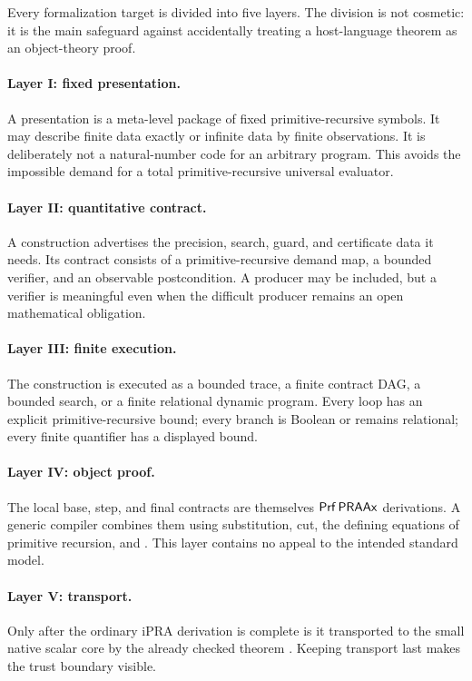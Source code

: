 Every formalization target is divided into five layers. The division is not cosmetic: it is the main safeguard against accidentally treating a host-language theorem as an object-theory proof.

\paragraph{Layer I: fixed presentation.}
A presentation is a meta-level package of fixed primitive-recursive symbols. It may describe finite data exactly or infinite data by finite observations. It is deliberately not a natural-number code for an arbitrary program. This avoids the impossible demand for a total primitive-recursive universal evaluator.

\paragraph{Layer II: quantitative contract.}
A construction advertises the precision, search, guard, and certificate data it needs. Its contract consists of a primitive-recursive demand map, a bounded verifier, and an observable postcondition. A producer may be included, but a verifier is meaningful even when the difficult producer remains an open mathematical obligation.

\paragraph{Layer III: finite execution.}
The construction is executed as a bounded trace, a finite contract DAG, a bounded search, or a finite relational dynamic program. Every loop has an explicit primitive-recursive bound; every branch is Boolean or remains relational; every finite quantifier has a displayed bound.

\paragraph{Layer IV: object proof.}
The local base, step, and final contracts are themselves \(\mathsf{Prf}\,\mathsf{PRAAx}\) derivations. A generic compiler combines them using substitution, cut, the defining equations of primitive recursion, and . This layer contains no appeal to the intended standard model.

\paragraph{Layer V: transport.}
Only after the ordinary iPRA derivation is complete is it transported to the small native scalar core by the already checked theorem . Keeping transport last makes the trust boundary visible.

